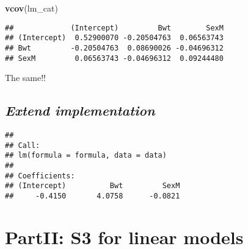 \documentclass[12,]{article}
\newenvironment{Shaded}{\begin{snugshade}}{\end{snugshade}}
\newcommand{\KeywordTok}[1]{\textcolor[rgb]{0.13,0.29,0.53}{\textbf{#1}}}
\newcommand{\DataTypeTok}[1]{\textcolor[rgb]{0.13,0.29,0.53}{#1}}
\newcommand{\StringTok}[1]{\textcolor[rgb]{0.31,0.60,0.02}{#1}}
\newcommand{\CommentTok}[1]{\textcolor[rgb]{0.56,0.35,0.01}{\textit{#1}}}
\newcommand{\ControlFlowTok}[1]{\textcolor[rgb]{0.13,0.29,0.53}{\textbf{#1}}}
\newcommand{\OperatorTok}[1]{\textcolor[rgb]{0.81,0.36,0.00}{\textbf{#1}}}
\newcommand{\NormalTok}[1]{#1}
\begin{document}
\begin{Shaded}
\begin{Highlighting}[]
\KeywordTok{vcov}\NormalTok{(lm_cat)}
\end{Highlighting}
\end{Shaded}

\begin{verbatim}
##             (Intercept)         Bwt        SexM
## (Intercept)  0.52900070 -0.20504763  0.06563743
## Bwt         -0.20504763  0.08690026 -0.04696312
## SexM         0.06563743 -0.04696312  0.09244480
\end{verbatim}

The same!!

\subsection{\texorpdfstring{\emph{Extend
implementation}}{Extend implementation}}\label{extend-implementation}

\begin{Shaded}
\end{Shaded}

\begin{verbatim}
## 
## Call:
## lm(formula = formula, data = data)
## 
## Coefficients:
## (Intercept)          Bwt         SexM  
##     -0.4150       4.0758      -0.0821
\end{verbatim}

\section{PartII: S3 for linear
models}\label{partii-s3-for-linear-models}
\end{document}
